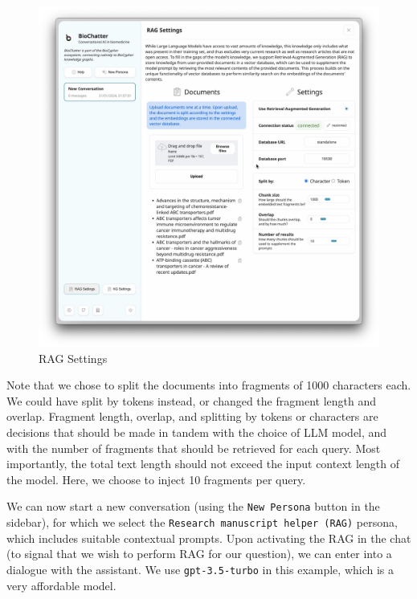 \begin{fignos:no-prefix-figure-caption}

\begin{figure}
\centering
\includegraphics{images/rag-settings.png}
\caption{RAG Settings}
\end{figure}

\end{fignos:no-prefix-figure-caption}

Note that we chose to split the documents into fragments of 1000 characters
each. We could have split by tokens instead, or changed the fragment length and
overlap. Fragment length, overlap, and splitting by tokens or characters are
decisions that should be made in tandem with the choice of LLM model, and with
the number of fragments that should be retrieved for each query. Most
importantly, the total text length should not exceed the input context length
of the model. Here, we choose to inject 10 fragments per query.

We can now start a new conversation (using the \texttt{New\ Persona} button in the
sidebar), for which we select the \texttt{Research\ manuscript\ helper\ (RAG)} persona,
which includes suitable contextual prompts. Upon activating the RAG in the chat
(to signal that we wish to perform RAG for our question), we can enter into a
dialogue with the assistant. We use \texttt{gpt-3.5-turbo} in this example, which is a
very affordable model.

